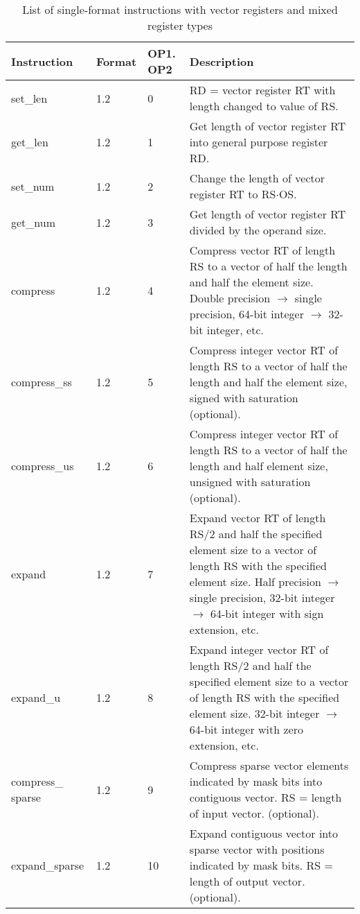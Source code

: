 \documentclass[forwardcom.tex]{subfiles}
\begin{document}
\begin{longtable} {|p{20mm}|p{10mm}|p{8mm}|p{75mm}|}
\caption{List of single-format instructions with vector registers and mixed register types} 
\label{table:ListOfSingleFormatInstructionsVector} \\
\endfirsthead
\endhead
\hline
\bfseries Instruction & \bfseries Format &\bfseries OP1. OP2 & \bfseries Description \\
\hline
set\_len      & 1.2 &  0 & RD = vector register RT with length changed to value of RS. \\
get\_len      & 1.2 &  1 & Get length of vector register RT into general purpose register RD. \\
set\_num      & 1.2 &  2 & Change the length of vector register RT to RS$\cdot$OS. \\
get\_num      & 1.2 &  3 & Get length of vector register RT divided by the operand size. \\
compress      & 1.2 &  4 & Compress vector RT of length RS to a vector of half the length and half the element size. Double precision $\rightarrow$ single precision, 64-bit
integer $\rightarrow$ 32-bit integer, etc. \\
compress\_ss  & 1.2 &  5 & Compress integer vector RT of length RS to a vector of half the length and half the element size, signed with saturation (optional). \\
compress\_us  & 1.2 &  6 & Compress integer vector RT of length RS to a vector of half the length and half element size, unsigned with saturation (optional). \\
expand        & 1.2 &  7 & Expand vector RT of length RS/2 and half the specified element size to a vector of length RS with the specified element size. Half
precision $\rightarrow$ single precision, 32-bit integer $\rightarrow$ 64-bit integer with sign extension, etc. \\
expand\_u    & 1.2 &  8 & Expand integer vector RT of length RS/2 and half the specified element size to a vector of length RS with the specified element
size. 32-bit integer $\rightarrow$ 64-bit integer with zero extension, etc. \\
compress\_ sparse&1.2 &  9 & Compress sparse vector elements indicated by mask bits into contiguous vector. RS = length of input vector. (optional). \\
expand\_sparse& 1.2 & 10 & Expand contiguous vector into sparse vector with positions
indicated by mask bits. RS = length of output vector. (optional). \\

\end{longtable}
\end{document}
